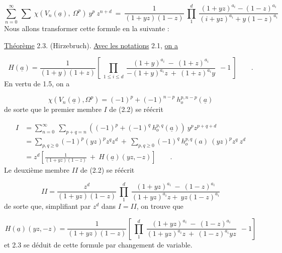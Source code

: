 
\begin{equation}\tag{2.2}
\sum_{n=0}^{\infty}\ \sum\ \chi(V_n(\underline{a}),\ \Omega^p)\ y^p\ z^{n+d}\ =\ \frac{1}{(1+yz)(1-z)}\ \prod_{1}^{d}\ \frac{(1+yz)^{a_i}-(1-z)^{a_i}}{(i+yz)^{a_i}+y(1-z)^{a_i}}
\end{equation}
Nous allons transformer cette formule en la suivante :

\underline{Théorème} 2.3. (Hirzebruch). \underline{Avec les notations} 2.1, \underline{on a}

\begin{equation*}
H(\underline{a}) = \frac{1}{(1+y)(1+z)}\left[\ \prod_{1\leq i\leq d}\ \frac{(1+y)^{a_i}\ -\ (1+z)^{a_i}}{-(1+y)^{a_i}z\ +\ (1+z)^{a_i}y}\ \ -1\ \right] \qquad .
\end{equation*}
En vertu de 1.5, on a

\begin{equation*}
\chi(V_n(\underline{a}),\Omega^p) = (-1)^p + (-1)^{n-p}\ h_o^{p,n-p}(\underline{a})
\end{equation*}
de sorte que le premier membre $I$ de (2.2) se réécrit

\begin{equation*}
\begin{aligned}
I &= \sum_{n=0}^{\infty}\ \sum_{p+q=n} ((-1)^p+(-1)^q\ h_o^{p,q}(\underline{a}))\ y^p z^{p+q+d}\\
&= \sum_{p,q\geq 0} (-1)^p(yz)^p z^q z^d\ +\ \sum_{p,q\geq 0} (-1)^q\ h_o^{p,q}(a)\ (yz)^p z^q\ z^d\\
&= z^d\left[\frac{1}{(1+yz)(1-z)}\ +\ H(\underline{a})(yz,-z)\right] \qquad .
\end{aligned}
\end{equation*}
Le deuxième membre $II$ de (2.2) se réécrit

\begin{equation*}
II = \frac{z^d}{(1+yz)(1-z)}\ \prod_{1}^{d}\ \frac{(1+yz)^{a_i}\ -\ (1-z)^{a_i}}{(1+yz)^{a_i}z+\ yz(1-z)^{a_i}}
\end{equation*}
de sorte que, simplifiant par $z^d$ dans $I = II$, on trouve que

\begin{equation*}
H(\underline{a})(yz,-z) = \frac{1}{(1+yz)(1-z)}\left[\ \prod_{1}^{d}\ \frac{(1+yz)^{a_i}\ -\ (1-z)^{a_i}}{(1+yz)^{a_i}z\ +\ (1-z)^{a_i}yz}\ \ -1\right]
\end{equation*}
et 2.3 se déduit de cette formule par changement de variable.


